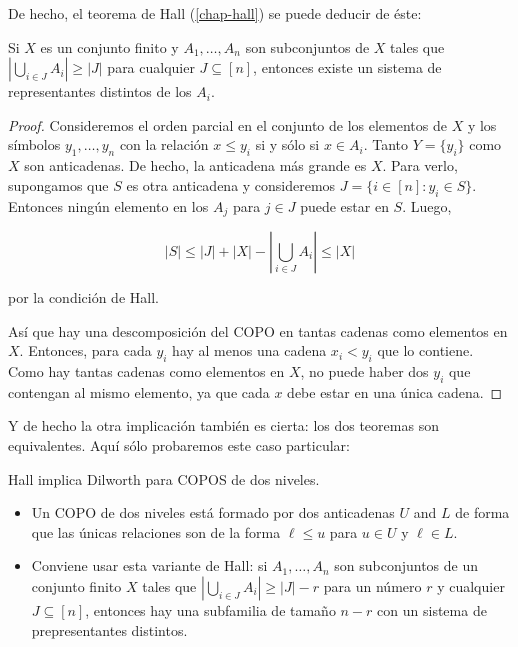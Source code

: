 De hecho, el teorema de
Hall (\ref{chap-hall}) se puede deducir de
éste:
\begin{corollary}\label{theorem-hall}
Si $X$ es un conjunto finito y $A_1,
\ldots,A_n$ son subconjuntos de $X$ tales que
$ \left|\bigcup_{i\in J}A_i \right|\geq|J|$
para cualquier $J\subseteq[n]$, entonces
existe un sistema de representantes distintos
de los $A_i$.
\end{corollary}
\begin{proof}
Consideremos el orden parcial en el conjunto
de los elementos de $X$ y los símbolos $y_1,
\ldots,y_n$ con la relación $x\leq y_i$ si y
sólo si $x\in A_i$. Tanto $Y = \{y_i\}$ como
$X$ son anticadenas. De hecho, la anticadena
más grande es $X$. Para verlo, supongamos que
$S$ es otra anticadena y consideremos $J =
\{i\in[n]:y_i\in S\}$. Entonces ningún
elemento en los $A_j$ para $j\in J$ puede
estar en $S$. Luego,

$$
|S|\leq|J| + |X|- \left|\bigcup_{i\in J}A_i
\right|\leq|X|
$$

por la condición de Hall.

Así que hay una descomposición del COPO en
tantas cadenas como elementos en $X$.
Entonces, para cada $y_i$ hay al menos una
cadena $x_i<y_i$ que lo contiene. Como hay
tantas cadenas como elementos en $X$, no
puede haber dos $y_i$ que contengan al mismo
elemento, ya que cada $x$ debe estar en una
única cadena.
\end{proof}
Y de hecho la otra implicación también es
cierta: los dos teoremas son equivalentes.
Aquí sólo probaremos este caso particular:
\begin{exercise}
\label{exercise-combi-002}
Hall implica Dilworth para COPOS de dos
niveles.
\begin{itemize}
\item Un COPO de dos niveles está formado por
dos anticadenas $U$ and $L$ de forma que las
únicas relaciones son de la forma $\ell\leq
u$ para $u\in U$ y $\ell\in L$.
\item Conviene usar esta variante de Hall: si
$A_1, \ldots,A_n$ son subconjuntos de un
conjunto finito $X$ tales que $
\left|\bigcup_{i\in J}A_i \right|\geq|J|-r$
para un número $r$ y cualquier $J\subseteq
[n]$, entonces hay una subfamilia de tamaño
$n-r$ con un sistema de prepresentantes
distintos.
\end{itemize}
\end{exercise}

